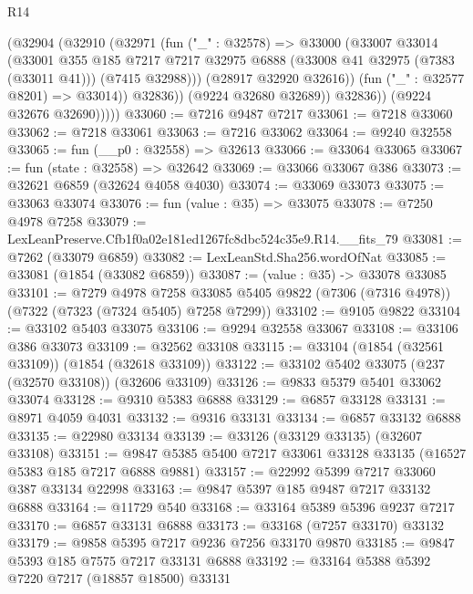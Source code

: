 \begin{lexlean}{R14}
\begin{coremodule}
                  (@32904
                    (@32910
                      (@32971
                        (fun ("_" : @32578) =>
                        @33000
                          (@33007
                            @33014
                            (@33001
                              @355
                              @185
                              @7217
                              @7217
                              @32975
                              @6888
                              (@33008 @41 @32975 (@7383 (@33011 @41)))
                              (@7415 @32988)))
                          (@28917 @32920 @32616))
                        (fun ("_" : @32577 @8201) => @33014))
                      @32836))
                  (@9224 @32680 @32689))
                @32836))
            (@9224 @32676 @32690)))))
@33060 := @7216 @9487 @7217
@33061 := @7218 @33060
@33062 := @7218 @33061
@33063 := @7216 @33062
@33064 := @9240 @32558
@33065 := fun (__p0 : @32558) => @32613
@33066 := @33064 @33065
@33067 := fun (state : @32558) => @32642
@33069 := @33066 @33067 @386
@33073 := @32621 @6859 (@32624 @4058 @4030)
@33074 := @33069 @33073
@33075 := @33063 @33074
@33076 := fun (value : @35) => @33075
@33078 := @7250 @4978 @7258
@33079 := LexLeanPreserve.Cfb1f0a02e181ed1267fc8dbc524c35e9.R14.__fits_79
@33081 := @7262 (@33079 @6859)
@33082 := LexLeanStd.Sha256.wordOfNat
@33085 := @33081 (@1854 (@33082 @6859))
@33087 := (value : @35) -> @33078 @33085
@33101 := @7279
    @4978
    @7258
    @33085
    @5405
    @9822
    (@7306 (@7316 @4978))
    (@7322 (@7323 (@7324 @5405) @7258 @7299))
@33102 := @9105 @9822
@33104 := @33102 @5403 @33075
@33106 := @9294 @32558 @33067
@33108 := @33106 @386 @33073
@33109 := @32562 @33108
@33115 := @33104 (@1854 (@32561 @33109)) (@1854 (@32618 @33109))
@33122 := @33102 @5402 @33075 (@237 (@32570 @33108)) (@32606 @33109)
@33126 := @9833 @5379 @5401 @33062 @33074
@33128 := @9310 @5383 @6888
@33129 := @6857 @33128
@33131 := @8971 @4059 @4031
@33132 := @9316 @33131
@33134 := @6857 @33132 @6888
@33135 := @22980 @33134
@33139 := @33126 (@33129 @33135) (@32607 @33108)
@33151 := @9847 @5385 @5400 @7217 @33061 @33128 @33135 (@16527 @5383 @185 @7217 @6888 @9881)
@33157 := @22992 @5399 @7217 @33060 @387 @33134 @22998
@33163 := @9847 @5397 @185 @9487 @7217 @33132 @6888
@33164 := @11729 @540
@33168 := @33164 @5389 @5396 @9237 @7217
@33170 := @6857 @33131 @6888
@33173 := @33168 (@7257 @33170) @33132
@33179 := @9858 @5395 @7217 @9236 @7256 @33170 @9870
@33185 := @9847 @5393 @185 @7575 @7217 @33131 @6888
@33192 := @33164 @5388 @5392 @7220 @7217 (@18857 @18500) @33131

\end{coremodule}
\end{lexlean}
